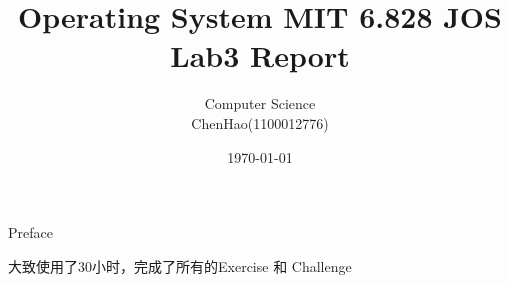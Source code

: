 \documentclass[GBK,winfonts,a4paper,10pt]{ctexart}
\begin{document}
\rhead{}
\lhead{}
\cfoot{\thepage}
\renewcommand{\footrulewidth}{0.4pt}
\renewcommand{\algorithmicrequire}{\textbf{Input:}}
\renewcommand{\algorithmicensure}{\textbf{Output:}}
\setlength{\tabcolsep}{2pt}

\setlength{\parindent}{2em}

\thispagestyle{fancy}


\title{Operating System MIT 6.828 JOS Lab3 Report}
\author{Computer Science \\ ChenHao(1100012776) }
\date{\today}
\maketitle

\thispagestyle{fancy}

\tableofcontents

\newpage


\par
\begin{section}{ Preface }
\par
大致使用了30小时，完成了所有的Exercise 和 Challenge
\end{section}
\end{document}
